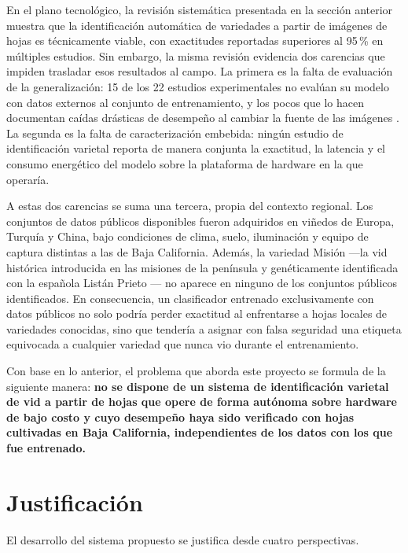En el plano tecnológico, la revisión sistemática presentada en la
sección anterior muestra que la identificación automática de variedades a
partir de imágenes de hojas es técnicamente viable, con exactitudes
reportadas superiores al 95\,\% en múltiples estudios. Sin embargo, la misma
revisión evidencia dos carencias que impiden trasladar esos resultados al
campo. La primera es la falta de evaluación de la generalización: 15 de los
22 estudios experimentales no evalúan su modelo con datos externos al
conjunto de entrenamiento, y los pocos que lo hacen documentan caídas
drásticas de desempeño al cambiar la fuente de las imágenes
\citep{denart2024, carneiro2024mae}. La segunda es la falta de
caracterización embebida: ningún estudio de identificación varietal reporta
de manera conjunta la exactitud, la latencia y el consumo energético del
modelo sobre la plataforma de hardware en la que operaría.

A estas dos carencias se suma una tercera, propia del contexto regional. Los
conjuntos de datos públicos disponibles fueron adquiridos en viñedos de
Europa, Turquía y China, bajo condiciones de clima, suelo, iluminación y
equipo de captura distintas a las de Baja California. Además, la variedad
Misión —la vid histórica introducida en las misiones de la península y
genéticamente identificada con la española Listán Prieto
\citep{tapia2007}— no aparece en ninguno de los conjuntos públicos
identificados. En consecuencia, un clasificador entrenado exclusivamente con
datos públicos no solo podría perder exactitud al enfrentarse a hojas
locales de variedades conocidas, sino que tendería a asignar con falsa
seguridad una etiqueta equivocada a cualquier variedad que nunca vio durante
el entrenamiento.

Con base en lo anterior, el problema que aborda este proyecto se formula de
la siguiente manera: \textbf{no se dispone de un sistema de identificación
varietal de vid a partir de hojas que opere de forma autónoma sobre hardware
de bajo costo y cuyo desempeño haya sido verificado con hojas cultivadas en
Baja California, independientes de los datos con los que fue entrenado.}

\section{Justificación}

El desarrollo del sistema propuesto se justifica desde cuatro perspectivas.

